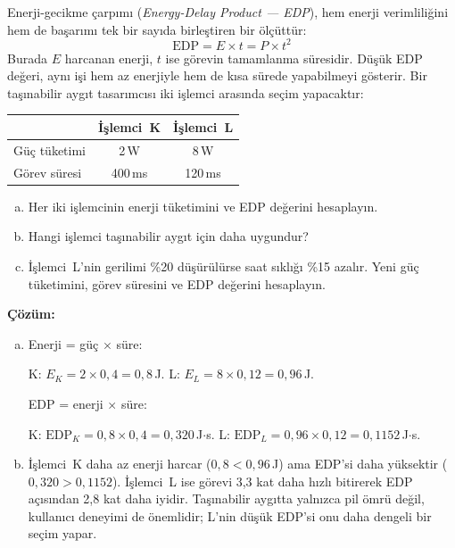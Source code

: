 \begin{ornek}[2.14]
\label{orn:edp}
Enerji-gecikme çarpımı (\emph{Energy-Delay Product --- EDP}), hem enerji verimliliğini hem de başarımı tek bir sayıda birleştiren bir ölçüttür:
\[
\text{EDP} = E \times t = P \times t^2
\]
Burada $E$ harcanan enerji, $t$ ise görevin tamamlanma süresidir. Düşük EDP değeri, aynı işi hem az enerjiyle hem de kısa sürede yapabilmeyi gösterir. Bir taşınabilir aygıt tasarımcısı iki işlemci arasında seçim yapacaktır:

\begin{center}
\small
\begin{tabular}{lcc}
\toprule
& \textbf{İşlemci~K} & \textbf{İşlemci~L} \\
\midrule
Güç tüketimi & 2\,W & 8\,W \\
Görev süresi & 400\,ms & 120\,ms \\
\bottomrule
\end{tabular}
\end{center}

\begin{enumerate}[(a)]
    \item Her iki işlemcinin enerji tüketimini ve EDP değerini hesaplayın.
    \item Hangi işlemci taşınabilir aygıt için daha uygundur?
    \item İşlemci~L'nin gerilimi \%20 düşürülürse saat sıklığı \%15 azalır. Yeni güç tüketimini, görev süresini ve EDP değerini hesaplayın.
\end{enumerate}

\textbf{Çözüm:}

\begin{enumerate}[(a)]
    \item Enerji = güç $\times$ süre:

    K: $E_K = 2 \times 0{,}4 = 0{,}8$\,J. \quad L: $E_L = 8 \times 0{,}12 = 0{,}96$\,J.

    EDP = enerji $\times$ süre:

    K: $\text{EDP}_K = 0{,}8 \times 0{,}4 = 0{,}320$\,J$\cdot$s. \quad L: $\text{EDP}_L = 0{,}96 \times 0{,}12 = 0{,}1152$\,J$\cdot$s.

    \item İşlemci~K daha az enerji harcar ($0{,}8 < 0{,}96$\,J) ama EDP'si daha yüksektir ($0{,}320 > 0{,}1152$). İşlemci~L ise görevi 3,3 kat daha hızlı bitirerek EDP açısından 2,8 kat daha iyidir. Taşınabilir aygıtta yalnızca pil ömrü değil, kullanıcı deneyimi de önemlidir; L'nin düşük EDP'si onu daha dengeli bir seçim yapar.


\end{enumerate}
\end{ornek}
